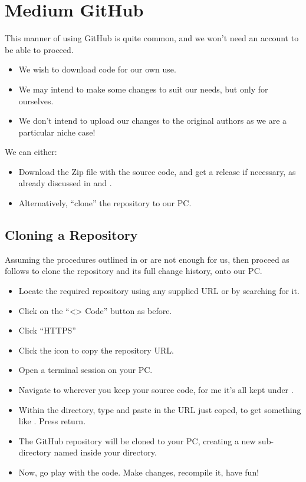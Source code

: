 \chapter{Medium GitHub}\label{chap: Medium GitHub}

This manner of using GitHub is quite common, and we won't need an account to be able to proceed.

\begin{itemize}
    \item We wish to download code for our own use.
    \item We may intend to make some changes to suit our needs, but only for ourselves.
    \item We don't intend to upload our changes to the original authors as we are a particular niche case!
\end{itemize}

We can either:

\begin{itemize}
    \item Download the Zip file with the source code, and get a release if necessary, as already discussed in  and .
    \item Alternatively, ``clone'' the repository to our PC.
\end{itemize}

\section{Cloning a Repository}\label{sect: Cloning a repository}

Assuming the procedures outlined in  or  are not enough for us, then proceed as follows to clone the repository and its full change history, onto our PC.

\begin{itemize}
    \item Locate the required repository using any supplied URL or by searching for it.
    \item Click on the ``<> Code'' button as before.
    \item Click ``HTTPS''
    \item Click the icon to copy the repository URL.
    \item Open a terminal session on your PC.
    \item Navigate to wherever you keep your source code, for me it's all kept under .
    \item Within the  directory, type  and paste in the URL just coped, to get something like . Press return.
    \item The GitHub repository will be cloned to your PC, creating a new sub-directory named  inside your  directory.
    \item Now, go play with the code. Make changes, recompile it, have fun!
\end{itemize}


